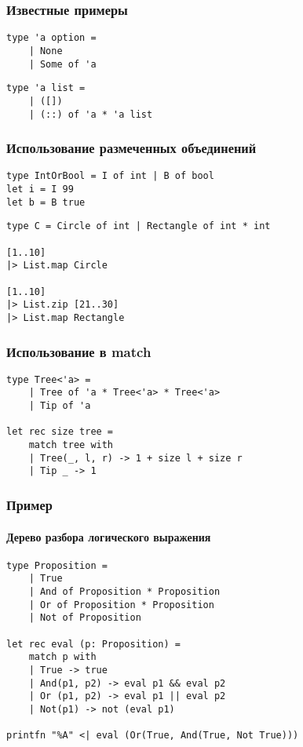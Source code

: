 \documentclass[xetex,mathserif,serif]{beamer}
\begin{document}
	\begin{frame}[fragile]
		\frametitle{Известные примеры}
		\begin{verbatim}
type 'a option =
    | None
    | Some of 'a
		\end{verbatim}

		\begin{verbatim}
type 'a list =
    | ([])
    | (::) of 'a * 'a list
		\end{verbatim}
	\end{frame}

	\begin{frame}[fragile]
		\frametitle{Использование размеченных объединений}
		\begin{verbatim}
type IntOrBool = I of int | B of bool
let i = I 99
let b = B true
		\end{verbatim}
		
		\begin{verbatim}
type C = Circle of int | Rectangle of int * int

[1..10]
|> List.map Circle

[1..10]
|> List.zip [21..30]
|> List.map Rectangle
		\end{verbatim}
	\end{frame}

	\begin{frame}[fragile]
		\frametitle{Использование в match}
		\begin{verbatim}
type Tree<'a> =
    | Tree of 'a * Tree<'a> * Tree<'a>
    | Tip of 'a

let rec size tree =
    match tree with
    | Tree(_, l, r) -> 1 + size l + size r
    | Tip _ -> 1
		\end{verbatim}
	\end{frame}

	\begin{frame}[fragile]
		\frametitle{Пример}
		\framesubtitle{Дерево разбора логического выражения}
		\begin{verbatim}
type Proposition =
    | True
    | And of Proposition * Proposition
    | Or of Proposition * Proposition
    | Not of Proposition

let rec eval (p: Proposition) =
    match p with
    | True -> true
    | And(p1, p2) -> eval p1 && eval p2
    | Or (p1, p2) -> eval p1 || eval p2
    | Not(p1) -> not (eval p1)

printfn "%A" <| eval (Or(True, And(True, Not True)))
		\end{verbatim}
	\end{frame}
\end{document}
